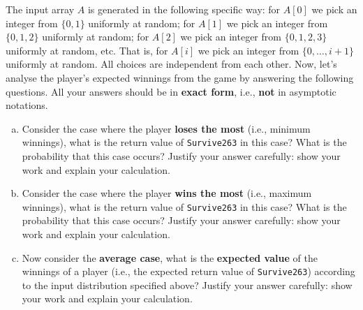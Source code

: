 \documentclass{assignment-263}
\begin{document}
\begin{enumerate}
		The input array $A$ is generated in the following specific way: for
		$A[0]$ we pick an integer from $\{0, 1\}$ uniformly at random; for
		$A[1]$ we pick an integer from $\{0, 1, 2\}$ uniformly at random;
		for $A[2]$ we pick an integer from $\{0, 1, 2, 3\}$ uniformly at
		random, etc. That is, for $A[i]$ we pick  an integer from
		$\{0,\ldots, i+1\}$ uniformly at random. All choices are independent
		from each other. Now, let's analyse the player's expected winnings
		from the game by answering the following questions. 
		All your answers
		should be in \textbf{exact form}, i.e., \textbf{not} in asymptotic
		notations.

		\begin{enumerate}[(a)]

			\item Consider the case where the player \textbf{loses the most}
				(i.e., minimum winnings), what is the return value of
				\texttt{Survive263} in this case? What is the probability that this case
				occurs? Justify your answer carefully: show your work and
				explain your calculation.

			\item Consider the case where the player \textbf{wins the most}
				(i.e., maximum winnings), what is the return value of
				\texttt{Survive263} in this case? What is the probability that this case
				occurs? Justify your answer carefully: show your work and
				explain your calculation.

			\item Now consider the \textbf{average case}, what is the
				\textbf{expected value} of the winnings of a player (i.e.,
				the expected return value of \texttt{Survive263}) according to
				the input distribution specified above? Justify your answer
				carefully: show your work and explain your calculation.


\end{enumerate}
\end{enumerate}
\end{document}
